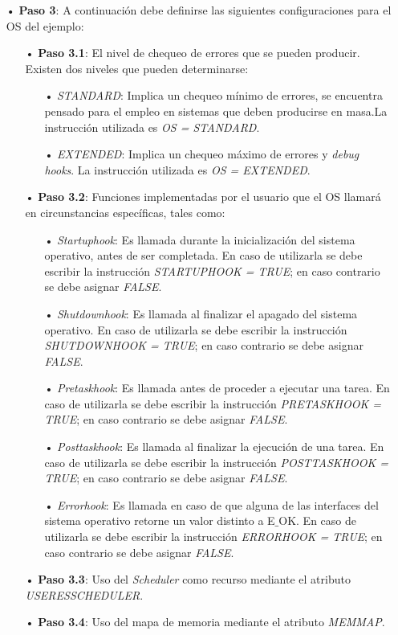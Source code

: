 \documentclass[12pt,letterpaper]{article}
\begin{document}
\begin{enumerate}
\item[•]\textbf{Paso 3}: A continuación debe definirse las siguientes configuraciones para el OS del ejemplo:
\begin{enumerate}
\item[•]\textbf{Paso 3.1}: El nivel de chequeo de errores que se pueden producir. Existen dos niveles que pueden determinarse: 
\begin{enumerate}
\item[•]\textit{STANDARD}: Implica un chequeo mínimo de errores, se encuentra pensado para el empleo en sistemas que deben producirse en masa.La instrucción utilizada es \textit{OS = STANDARD}. 
\item[•]\textit{EXTENDED}: Implica un chequeo máximo de errores y \textit{debug hooks}. La instrucción utilizada es \textit{OS = EXTENDED}.
\end{enumerate}
\item[•]\textbf{Paso 3.2}: Funciones implementadas por el usuario que el OS llamará en circunstancias específicas, tales como:
\begin{enumerate}
\item[•]\textit{Startuphook}: Es  llamada  durante  la  inicialización  del  sistema  operativo,  antes  de  ser completada. En caso de utilizarla se debe escribir la instrucción \textit{STARTUPHOOK = TRUE}; en caso contrario se debe asignar \textit{FALSE}.
\item[•]\textit{Shutdownhook}: Es llamada al finalizar el apagado del sistema operativo. En caso de utilizarla se debe escribir la instrucción \textit{SHUTDOWNHOOK = TRUE}; en caso contrario se debe asignar \textit{FALSE}.
\item[•]\textit{Pretaskhook}: Es llamada antes de proceder a ejecutar una tarea. En caso de utilizarla se debe escribir la instrucción \textit{PRETASKHOOK = TRUE}; en caso contrario se debe asignar \textit{FALSE}.
\item[•]\textit{Posttaskhook}: Es llamada al finalizar la ejecución de una tarea. En caso de utilizarla se debe escribir la instrucción \textit{POSTTASKHOOK = TRUE}; en caso contrario se debe asignar \textit{FALSE}.
\item[•]\textit{Errorhook}: Es llamada en caso de que alguna de las interfaces del sistema operativo retorne un valor distinto a E$\_$OK. En caso de utilizarla se debe escribir la instrucción \textit{ERRORHOOK = TRUE}; en caso contrario se debe asignar \textit{FALSE}.
\end{enumerate}
\item[•]\textbf{Paso 3.3}: Uso del \textit{Scheduler} como recurso mediante el atributo \textit{USERESSCHEDULER}.
\item[•]\textbf{Paso 3.4}: Uso del mapa de memoria mediante el atributo \textit{MEMMAP}.
\end{enumerate}
 

\end{enumerate}
\end{document}
